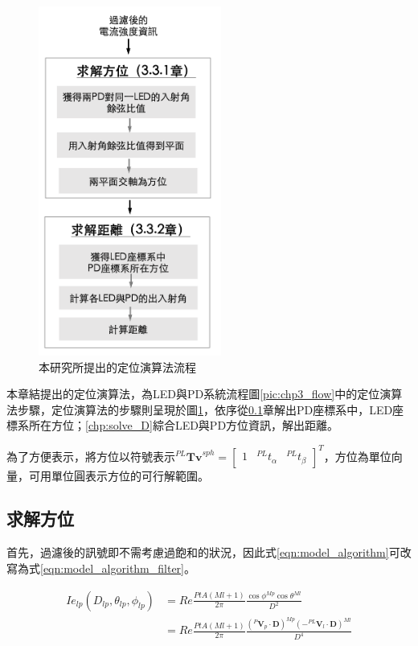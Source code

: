 \begin{figure}[h!]
    \centering
    \includegraphics[width=6cm]{ch3pic/algorithm_flow.png}
    \caption{本研究所提出的定位演算法流程}
    \label{pic:algorithm_flow}
\end{figure}

本章結提出的定位演算法，為LED與PD系統流程圖\ref{pic:chp3_flow}中的定位演算法步驟，定位演算法的步驟則呈現於圖\ref{pic:algorithm_flow}，依序從\ref{chp:solve_phi}章解出PD座標系中，LED座標系所在方位；\ref{chp:solve_D}綜合LED與PD方位資訊，解出距離。

為了方便表示，將方位以符號表示$^{PL}\boldsymbol{Tv}^{sph} = \left[\begin{array}{ccc}1&^{PL}t_{\alpha}&^{PL}t_{\beta}\end{array}\right]^T$，方位為單位向量，可用單位圓表示方位的可行解範圍。





    \subsection{求解方位}
    \label{chp:solve_phi}

    首先，過濾後的訊號即不需考慮過飽和的狀況，因此式\ref{eqn:model_algorithm}可改寫為式\ref{eqn:model_algorithm_filter}。

    \begin{equation}
        \label{eqn:model_algorithm_filter}
        \begin{aligned}
            Ie_{lp}(D_{lp},\theta_{lp},\phi_{lp}) &= Re\frac{PtA(Ml+1)}{2\pi}\frac{{\cos\phi}^{Mp}{\cos\theta}^{Ml}}{D^2}\\
            & = Re\frac{PtA(Ml+1)}{2\pi}\frac{{(^{P}\boldsymbol{V}_p\cdot\boldsymbol{D})}^{Mp}{(-^{PL}\boldsymbol{V}_l\cdot\boldsymbol{D})}^{Ml}}{D^4}
        \end{aligned}
    \end{equation}

